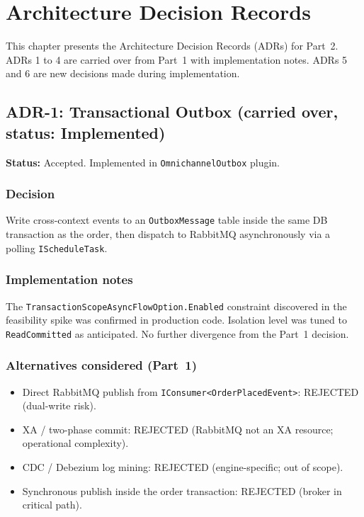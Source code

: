 \chapter{Architecture Decision Records}
\label{ch:adr}

This chapter presents the Architecture Decision Records (ADRs) for Part~2. ADRs 1 to 4 are carried over from Part~1 with implementation notes. ADRs 5 and 6 are new decisions made during implementation.

\section*{ADR-1: Transactional Outbox (carried over, status: Implemented)}

\textbf{Status:} Accepted. Implemented in \texttt{OmnichannelOutbox} plugin.

\subsection*{Decision}
Write cross-context events to an \texttt{OutboxMessage} table inside the same DB transaction as the order, then dispatch to RabbitMQ asynchronously via a polling \texttt{IScheduleTask}.

\subsection*{Implementation notes}
The \texttt{TransactionScopeAsyncFlowOption.Enabled} constraint discovered in the feasibility spike was confirmed in production code. Isolation level was tuned to \texttt{ReadCommitted} as anticipated. No further divergence from the Part~1 decision.

\subsection*{Alternatives considered (Part~1)}
\begin{itemize}
    \item Direct RabbitMQ publish from \texttt{IConsumer<OrderPlacedEvent>}: REJECTED (dual-write risk).
    \item XA / two-phase commit: REJECTED (RabbitMQ not an XA resource; operational complexity).
    \item CDC / Debezium log mining: REJECTED (engine-specific; out of scope).
    \item Synchronous publish inside the order transaction: REJECTED (broker in critical path).
\end{itemize}

